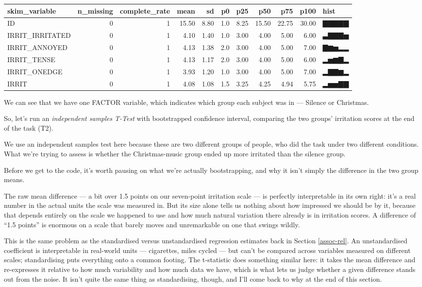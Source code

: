 \documentclass[
]{book}
\begin{document}
\begin{tabular}{l|r|r|r|r|r|r|r|r|r|l}
\hline
skim\_variable & n\_missing & complete\_rate & mean & sd & p0 & p25 & p50 & p75 & p100 & hist\\
\hline
ID & 0 & 1 & 15.50 & 8.80 & 1.0 & 8.25 & 15.50 & 22.75 & 30.00 & ▇▇▇▇▇\\
\hline
IRRIT\_IRRITATED & 0 & 1 & 4.10 & 1.40 & 1.0 & 3.00 & 4.00 & 5.00 & 6.00 & ▃▇▇▇▅\\
\hline
IRRIT\_ANNOYED & 0 & 1 & 4.13 & 1.38 & 2.0 & 3.00 & 4.00 & 5.00 & 7.00 & ▇▆▅▂▂\\
\hline
IRRIT\_TENSE & 0 & 1 & 4.13 & 1.17 & 2.0 & 3.00 & 4.00 & 5.00 & 6.00 & ▂▅▆▇▂\\
\hline
IRRIT\_ONEDGE & 0 & 1 & 3.93 & 1.20 & 1.0 & 3.00 & 4.00 & 5.00 & 7.00 & ▂▇▇▆▂\\
\hline
IRRIT & 0 & 1 & 4.08 & 1.08 & 1.5 & 3.25 & 4.25 & 4.94 & 5.75 & ▂▅▅▇▇\\
\hline
\end{tabular}

We can see that we have one FACTOR variable, which indicates which group each subject was in --- Silence or Christmas.

So, let's run an \emph{independent samples T-Test} with bootstrapped confidence interval, comparing the two groups' irritation scores at the end of the task (T2).

We use an independent samples test here because these are two different groups of people, who did the task under two different conditions. What we're trying to assess is whether the Christmas-music group ended up more irritated than the silence group.

Before we get to the code, it's worth pausing on what we're actually bootstrapping, and why it isn't simply the difference in the two group means.

The raw mean difference --- a bit over 1.5 points on our seven-point irritation scale --- is perfectly interpretable in its own right: it's a real number in the actual units the scale was measured in. But its size alone tells us nothing about how impressed we should be by it, because that depends entirely on the scale we happened to use and how much natural variation there already is in irritation scores. A difference of ``1.5 points'' is enormous on a scale that barely moves and unremarkable on one that swings wildly.

This is the same problem as the standardised versus unstandardised regression estimates back in Section \ref{assoc-rel}. An unstandardised coefficient is interpretable in real-world units --- cigarettes, miles cycled --- but can't be compared across variables measured on different scales; standardising puts everything onto a common footing. The t-statistic does something similar here: it takes the mean difference and re-expresses it relative to how much variability and how much data we have, which is what lets us judge whether a given difference stands out from the noise. It isn't quite the same thing as standardising, though, and I'll come back to why at the end of this section.
\end{document}
